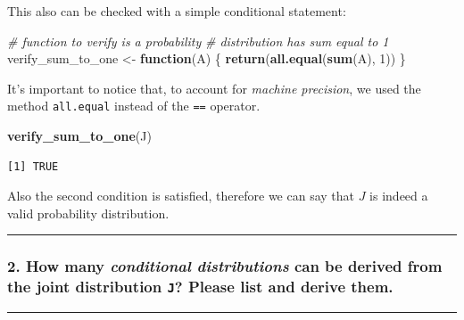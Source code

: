 \documentclass[
]{article}
\newenvironment{Shaded}{\begin{snugshade}}{\end{snugshade}}
\newcommand{\CommentTok}[1]{\textcolor[rgb]{0.56,0.35,0.01}{\textit{#1}}}
\newcommand{\ControlFlowTok}[1]{\textcolor[rgb]{0.13,0.29,0.53}{\textbf{#1}}}
\newcommand{\DecValTok}[1]{\textcolor[rgb]{0.00,0.00,0.81}{#1}}
\newcommand{\FunctionTok}[1]{\textcolor[rgb]{0.13,0.29,0.53}{\textbf{#1}}}
\newcommand{\NormalTok}[1]{#1}
\newcommand{\OtherTok}[1]{\textcolor[rgb]{0.56,0.35,0.01}{#1}}
\begin{document}
This also can be checked with a simple conditional statement:

\begin{Shaded}
\begin{Highlighting}[]
\CommentTok{\# function to verify is a probability}
\CommentTok{\# distribution has sum equal to 1}
\NormalTok{verify\_sum\_to\_one }\OtherTok{\textless{}{-}} \ControlFlowTok{function}\NormalTok{(A) \{}
    \FunctionTok{return}\NormalTok{(}\FunctionTok{all.equal}\NormalTok{(}\FunctionTok{sum}\NormalTok{(A), }\DecValTok{1}\NormalTok{))}
\NormalTok{\}}
\end{Highlighting}
\end{Shaded}

It's important to notice that, to account for \emph{machine precision},
we used the method \texttt{all.equal} instead of the \texttt{==}
operator.

\begin{Shaded}
\begin{Highlighting}[]
\FunctionTok{verify\_sum\_to\_one}\NormalTok{(J)}
\end{Highlighting}
\end{Shaded}

\begin{verbatim}
[1] TRUE
\end{verbatim}

Also the second condition is satisfied, therefore we can say that \(J\)
is indeed a valid probability distribution.

\begin{center}\rule{0.5\linewidth}{0.5pt}\end{center}

\hypertarget{how-many-conditional-distributions-can-be-derived-from-the-joint-distribution-j-please-list-and-derive-them.}{%
\subsubsection{\texorpdfstring{2. How many \emph{conditional
distributions} can be derived from the joint distribution \texttt{J}?
Please list and derive
them.}{2. How many conditional distributions can be derived from the joint distribution J? Please list and derive them.}}\label{how-many-conditional-distributions-can-be-derived-from-the-joint-distribution-j-please-list-and-derive-them.}}

\begin{center}\rule{0.5\linewidth}{0.5pt}\end{center}
\end{document}
